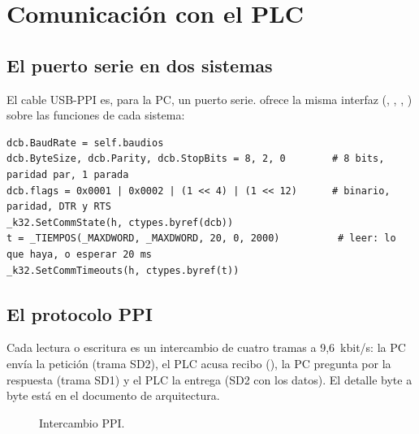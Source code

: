 \documentclass[a4paper,11pt]{article}
\begin{document}
\section{Comunicación con el PLC}
\subsection{El puerto serie en dos sistemas}
El cable USB-PPI es, para la PC, un puerto serie.  ofrece la misma interfaz (, , , ) sobre las funciones de cada sistema:

\begin{lstlisting}[style=py, caption={Configuración del puerto en Windows por ctypes (\texttt{serie.py}).}]
dcb.BaudRate = self.baudios
dcb.ByteSize, dcb.Parity, dcb.StopBits = 8, 2, 0        # 8 bits, paridad par, 1 parada
dcb.flags = 0x0001 | 0x0002 | (1 << 4) | (1 << 12)      # binario, paridad, DTR y RTS
_k32.SetCommState(h, ctypes.byref(dcb))
t = _TIEMPOS(_MAXDWORD, _MAXDWORD, 20, 0, 2000)          # leer: lo que haya, o esperar 20 ms
_k32.SetCommTimeouts(h, ctypes.byref(t))
\end{lstlisting}

\subsection{El protocolo PPI}
Cada lectura o escritura es un intercambio de cuatro tramas a 9,6~kbit/s: la PC envía la petición (trama SD2), el PLC acusa recibo (), la PC pregunta por la respuesta (trama SD1) y el PLC la entrega (SD2 con los datos). El detalle byte a byte está en el documento de arquitectura.

\begin{figure}[H]
\centering
{}
\caption{Intercambio PPI.}
\end{figure}
\end{document}
